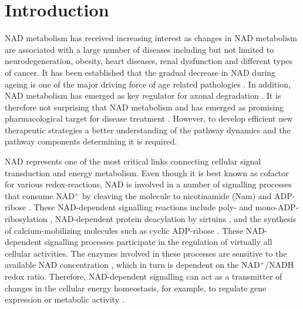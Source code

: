 
\section{Introduction}

NAD metabolism has received increasing interest as changes in NAD metabolism are associated with a large number of diseases including but not limited to neurodegeneration, obesity, heart diseases, renal dysfunction and different types of cancer. It has been established that the gradual decrease in NAD during ageing is one of the major driving force of age related pathologies \cite{Chini17}. In addition,  NAD metabolism has emerged as key regulator for axonal degradation \cite{Araki04}. It is therefore not surprising that NAD metabolism and has emerged as promising pharmacological target for disease treatment  \cite{EspindolaNetto2017,Yoshino18, Sinclair18}. However, to develop efficient new therapeutic strategies a better understanding of the pathway dynamics and the pathway components determining it is required.

NAD represents one of the most critical links connecting cellular signal transduction and energy metabolism. Even though it is best known as cofactor for various redox-reactions, NAD is involved in a number of signalling processes that consume NAD$^{+}$ by cleaving the molecule to nicotinamide (Nam) and ADP-ribose \cite{Verdin2015}. These NAD-dependent signalling reactions include poly- and mono-ADP-ribosylation \cite{Butepage2015,DeVos2012}, NAD-dependent protein deacylation by sirtuins \cite{Osborne2016}, and the synthesis of calcium-mobilizing molecules such as cyclic ADP-ribose \cite{Lee2012}. These NAD-dependent signalling processes participate in the regulation of virtually all cellular activities. The enzymes involved in these processes are sensitive to the available NAD concentration \cite{Ruggieri2015}, which in turn is dependent on the NAD$^{+}$/NADH redox ratio. Therefore, NAD-dependent signalling can act as a transmitter of changes in the cellular energy homeostasis, for example, to regulate gene expression or metabolic activity \cite{Koch-Nolte2009}.


